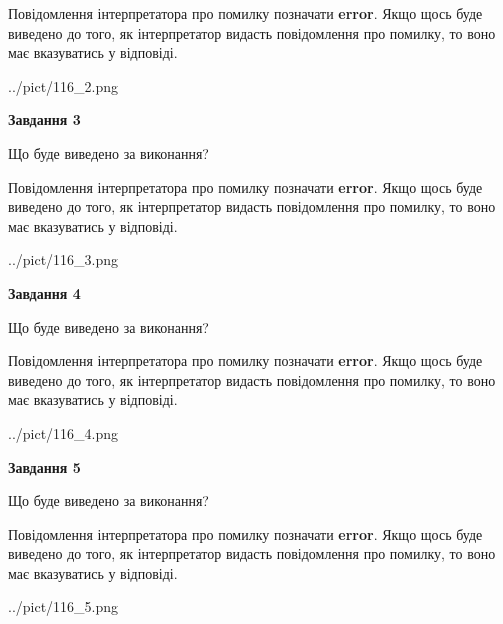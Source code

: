 \documentclass[12pt, ukrainian]{article}
\begin{document}
{\begin {large}
Повідомлення інтерпретатора про помилку позначати \textbf{error}.
Якщо щось буде виведено до того, як інтерпретатор видасть повідомлення про помилку, 
то воно має вказуватись у відповіді. \par


\begin{center}
	{../pict/116_2.png}
\end{center}
\newpage

{\begin {center}\textbf{Завдання 3}\end {center}}\par
Що буде виведено за виконання?

Повідомлення інтерпретатора про помилку позначати \textbf{error}.
Якщо щось буде виведено до того, як інтерпретатор видасть повідомлення про помилку, 
то воно має вказуватись у відповіді. \par


\begin{center}
	{../pict/116_3.png}
\end{center}
\newpage

{\begin {center}\textbf{Завдання 4}\end {center}}\par
Що буде виведено за виконання?

Повідомлення інтерпретатора про помилку позначати \textbf{error}.
Якщо щось буде виведено до того, як інтерпретатор видасть повідомлення про помилку, 
то воно має вказуватись у відповіді. \par


\begin{center}
	{../pict/116_4.png}
\end{center}
\newpage

{\begin {center}\textbf{Завдання 5}\end {center}}\par
Що буде виведено за виконання?

Повідомлення інтерпретатора про помилку позначати \textbf{error}.
Якщо щось буде виведено до того, як інтерпретатор видасть повідомлення про помилку, 
то воно має вказуватись у відповіді. \par


\begin{center}
	{../pict/116_5.png}
\end{center}
\newpage


\end{large}}
\end{document}

